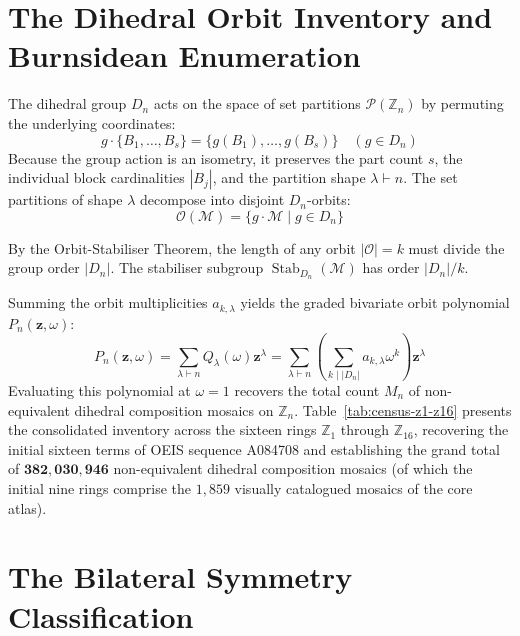 \section{The Dihedral Orbit Inventory and Burnsidean Enumeration}

The dihedral group $D_n$ acts on the space of set partitions $\mathcal{P}(\mathbb{Z}_n)$ by permuting the underlying coordinates:
\begin{equation}
g \cdot \{B_1, \dots, B_s\} = \{g(B_1), \dots, g(B_s)\} \quad (g \in D_n)
\end{equation}
Because the group action is an isometry, it preserves the part count $s$, the individual block cardinalities $|B_j|$, and the partition shape $\lambda \vdash n$. The set partitions of shape $\lambda$ decompose into disjoint $D_n$-orbits:
\begin{equation}
\mathcal{O}(\mathcal{M}) = \{g \cdot \mathcal{M} \mid g \in D_n\}
\end{equation}

By the Orbit-Stabiliser Theorem, the length of any orbit $|\mathcal{O}| = k$ must divide the group order $|D_n|$. The stabiliser subgroup $\operatorname{Stab}_{D_n}(\mathcal{M})$ has order $|D_n| / k$.

Summing the orbit multiplicities $a_{k,\lambda}$ yields the graded bivariate orbit polynomial $P_n(\mathbf{z}, \omega)$:
\begin{equation}
P_n(\mathbf{z}, \omega) = \sum_{\lambda \vdash n} Q_\lambda(\omega) \mathbf{z}^\lambda = \sum_{\lambda \vdash n} \left( \sum_{k \mid |D_n|} a_{k,\lambda} \omega^k \right) \mathbf{z}^\lambda
\end{equation}
Evaluating this polynomial at $\omega = 1$ recovers the total count $M_n$ of non-equivalent dihedral composition mosaics on $\mathbb{Z}_n$. Table~\ref{tab:census-z1-z16} presents the consolidated inventory across the sixteen rings $\mathbb{Z}_1$ through $\mathbb{Z}_{16}$, recovering the initial sixteen terms of OEIS sequence A084708 and establishing the grand total of $\mathbf{382{,}030{,}946}$ non-equivalent dihedral composition mosaics (of which the initial nine rings comprise the $1{,}859$ visually catalogued mosaics of the core atlas).



\section{The Bilateral Symmetry Classification}

